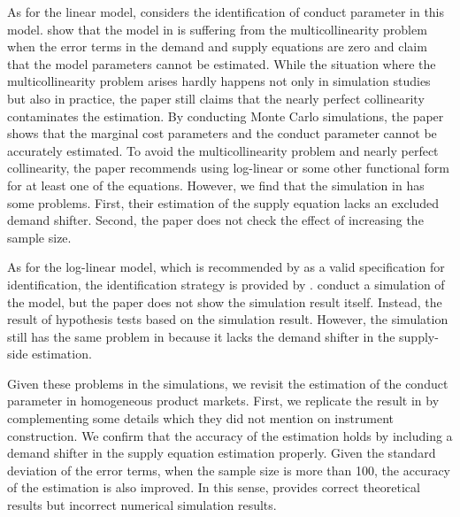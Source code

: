 \documentclass[11pt, a4paper]{article}
\begin{document}
As for the linear model, \citet{bresnahan1982oligopoly} considers the identification of conduct parameter in this model. 
\citet{perloff2012collinearity} show that the model in \citet{bresnahan1982oligopoly} is suffering from the multicollinearity problem when the error terms in the demand and supply equations are zero and claim that the model parameters cannot be estimated.
While the situation where the multicollinearity problem arises hardly happens not only in simulation studies but also in practice, the paper still claims that the nearly perfect collinearity contaminates the estimation.
By conducting Monte Carlo simulations, the paper shows that the marginal cost parameters and the conduct parameter cannot be accurately estimated.
To avoid the multicollinearity problem and nearly perfect collinearity, the paper recommends using log-linear or some other functional form for at least one of the equations.
However, we find that the simulation in \cite{perloff2012collinearity} has some problems.
First, their estimation of the supply equation lacks an excluded demand shifter.
Second, the paper does not check the effect of increasing the sample size. 

As for the log-linear model, which is recommended by \cite{perloff2012collinearity} as a valid specification for identification, the identification strategy is provided by \citet{lau1982identifying}.
\cite{hyde1995can} conduct a simulation of the model, but the paper does not show the simulation result itself. Instead, the result of hypothesis tests based on the simulation result.
However, the simulation still has the same problem in \cite{perloff2012collinearity} because it lacks the demand shifter in the supply-side estimation.

Given these problems in the simulations, we revisit the estimation of the conduct parameter in homogeneous product markets.
First, we replicate the result in \cite{perloff2012collinearity} by complementing some details which they did not mention on instrument construction. 
We confirm that the accuracy of the estimation holds by including a demand shifter in the supply equation estimation properly. 
Given the standard deviation of the error terms, when the sample size is more than 100, the accuracy of the estimation is also improved.
In this sense, \cite{perloff2012collinearity} provides correct theoretical results but incorrect numerical simulation results.
\end{document}
